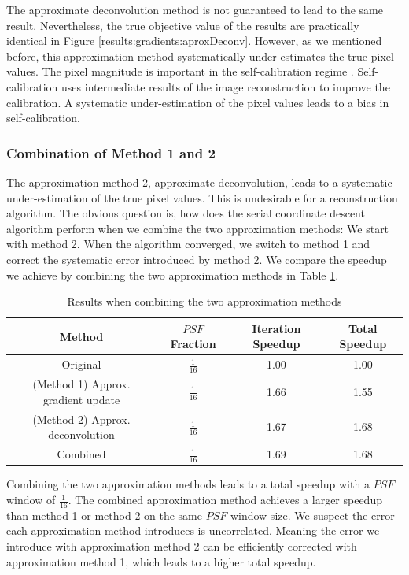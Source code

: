 The approximate deconvolution method is not guaranteed to lead to the same result. Nevertheless, the true objective value of the results are practically identical in Figure \ref{results:gradients:aproxDeconv}. However, as we mentioned before, this approximation method systematically under-estimates the true pixel values. The pixel magnitude is important in the self-calibration regime \cite{offringa2017optimized}. Self-calibration uses intermediate results of the image reconstruction to improve the calibration. A systematic under-estimation of the pixel values leads to a bias in self-calibration.


\subsubsection{Combination of Method 1 and 2}\label{results:gradients:comparison}
The approximation method 2, approximate deconvolution, leads to a systematic under-estimation of the true pixel values. This is undesirable for a reconstruction algorithm. The obvious question is, how does the serial coordinate descent algorithm perform when we combine the two approximation methods: We start with method 2. When the algorithm converged, we switch to method 1 and correct the systematic error introduced by method 2. We compare the speedup we achieve by combining the two approximation methods in Table \ref{results:gradients:comparison:speedup}.


\begin{table}[h]
	\centering
	\begin{tabular}{ c | c ||c|c } 
		\hline
		Method & $PSF$ Fraction & Iteration Speedup & Total Speedup \\ \hline \hline
		Original & $\frac{1}{16}$ & 1.00 & 1.00 \\ 
		(Method 1) Approx. gradient update & $\frac{1}{16}$ & 1.66 & 1.55 \\ 
		(Method 2) Approx. deconvolution & $\frac{1}{16}$ & 1.67 & 1.68 \\ \hline
		Combined & $\frac{1}{16}$ & 1.69 & 1.68 \\ 
		\hline
	\end{tabular}

	\caption{Results when combining the two approximation methods}
	\label{results:gradients:comparison:speedup}
	
\end{table}

Combining the two approximation methods leads to a total speedup with a $PSF$ window of $\frac{1}{16}$. The combined approximation method achieves a larger speedup than method 1 or method 2 on the same $PSF$ window size. We suspect the error each approximation method introduces is uncorrelated. Meaning the error we introduce with approximation method 2 can be efficiently corrected with approximation method 1, which leads to a higher total speedup.


